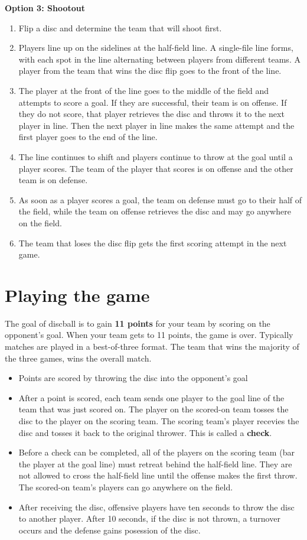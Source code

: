 \documentclass[10pt]{article}
\begin{document}
\textbf{Option 3: Shootout}
\begin{enumerate}
    \item Flip a disc and determine the team that will shoot first.
    \item Players line up on the sidelines at the half-field line. A single-file line forms, with each spot in the line alternating between players from different teams. A player from the team that wins the disc flip goes to the front of the line.
    \item The player at the front of the line goes to the middle of the field and attempts to score a goal. If they are successful, their team is on offense. If they do not score, that player retrieves the disc and throws it to the next player in line. Then the next player in line makes the same attempt and the first player goes to the end of the line.
    \item The line continues to shift and players continue to throw at the goal until a player scores. The team of the player that scores is on offense and the other team is on defense.
    \item As soon as a player scores a goal, the team on defense must go to their half of the field, while the team on offense retrieves the disc and may go anywhere on the field.
    \item The team that loses the disc flip gets the first scoring attempt in the next game.
\end{enumerate}

\section{Playing the game}

The goal of discball is to gain \textbf{11 points} for your team by scoring on the opponent's goal. When your team gets to 11 points, the game is over. Typically matches are played in a best-of-three format. The team that wins the majority of the three games, wins the overall match.
\begin{itemize}
    \item Points are scored by throwing the disc into the opponent's goal
    \item After a point is scored, each team sends one player to the goal line of the team that was just scored on. The player on the scored-on team tosses the disc to the player on the scoring team. The scoring team's player recevies the disc and tosses it back to the original thrower. This is called a \textbf{check}.
    \item Before a check can be completed, all of the players on the scoring team (bar the player at the goal line) must retreat behind the half-field line. They are not allowed to cross the half-field line until the offense makes the first throw. The scored-on team's players can go anywhere on the field.
    \item After receiving the disc, offensive players have ten seconds to throw the disc to another player. After 10 seconds, if the disc is not thrown, a turnover occurs and the defense gains posession of the disc.
\end{itemize}
\end{document}
